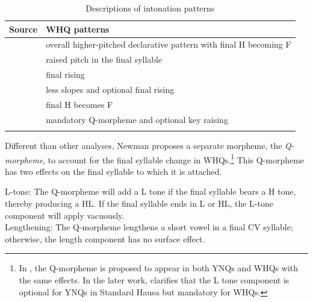 \documentclass[output=paper,colorlinks,citecolor=brown
]{langscibook}
\begin{document}
\begin{table}

{\begin{tabularx}{\textwidth}{lQ}
\lsptoprule
Source & WHQ patterns \\
\midrule
\citet{kk} &overall higher-pitched declarative pattern with final H becoming F \\
\tablevspace
\citet{meyers1976aspects}& raised pitch in the final syllable  \\
\tablevspace
\citet[p.101]{dresel1977} & final rising \\
\tablevspace
\citet{lindau1986}& less slopes and optional final rising\\
\tablevspace
\citet{miller} & final H becomes F \\
\tablevspace
\citet[p.~613]{newmangrammar}  & {mandatory Q-morpheme and optional key raising} \\
\lspbottomrule
\end{tabularx}}
\caption{Descriptions of intonation patterns}
\label{tab:Li:whqpattern}
\end{table}

Different than other analyses, Newman proposes a separate morpheme, the \textit{Q-morpheme}, to account for the final syllable change in WHQs.\footnote{In \citet{newmans1981q}, the Q-morpheme is proposed to appear in both YNQs and WHQs with the same effects. In the later work, \citet[p. 497]{newmangrammar} clarifies that the L tone component is optional for YNQs in Standard Hausa but mandatory for WHQs.} This Q-morpheme has two effects  on the final syllable to which it is attached.

\ea \label{ex:Li:effects}
\begin{xlist}
    \ex \label{ex:Li:L-tone} L-tone: The Q-morpheme will add a L tone if the final syllable bears a H tone, thereby producing a HL. If the final syllable ends in L or HL, the L-tone component will apply vacuously. \\
    \ex \label{ex:Li:Lengthening} Lengthening: The Q-morpheme lengthens a short vowel in a final CV syllable; otherwise, the length component has no surface effect.
\end{xlist}
 \z
\end{document}

